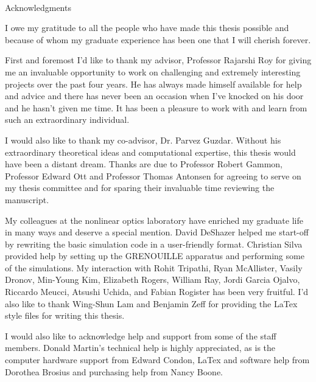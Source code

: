 
\renewcommand{\baselinestretch}{2}
\small\normalsize
\hbox{\ }
 
\vspace{.5in}

\begin{center}
\large{Acknowledgments} 
\end{center} 

\vspace{1ex}

I owe my gratitude to all the people who have made this thesis possible and because of whom my graduate experience has been one that I will cherish forever.

First and foremost I'd like to thank my advisor, Professor Rajarshi Roy for giving me an invaluable opportunity to work on challenging and extremely interesting projects over the past four years. He has always made himself available for help and advice and there has never been an occasion when I've knocked on his door and he hasn't given me time. It has been a pleasure to work with and learn from such an extraordinary individual.

I would also like to thank my co-advisor, Dr. Parvez Guzdar. Without his extraordinary theoretical ideas and computational expertise, this thesis would have been a distant dream. Thanks are due to Professor Robert Gammon, Professor Edward Ott and Professor Thomas Antonsen for agreeing to serve on my thesis committee and for sparing their invaluable time reviewing the manuscript.

My colleagues at the nonlinear optics laboratory have enriched my graduate life in many ways and deserve a special mention. David DeShazer helped me start-off by rewriting the basic simulation code in a user-friendly format. Christian Silva provided help by setting up the GRENOUILLE apparatus and performing some of the simulations. My interaction with  Rohit Tripathi, Ryan McAllister, Vasily Dronov, Min-Young Kim, Elizabeth Rogers, William Ray, Jordi Garcia Ojalvo, Riccardo Meucci, Atsushi Uchida, and Fabian Rogister has been very fruitful. I'd also like to thank Wing-Shun Lam and Benjamin Zeff for providing the LaTex style files for writing this thesis.

I would also like to acknowledge help and support from some of the staff members. Donald Martin's technical help is highly appreciated, as is the computer hardware support from Edward Condon, LaTex and software help from Dorothea Brosius and purchasing help from Nancy Boone.

